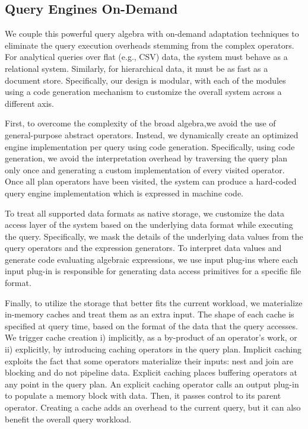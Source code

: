 \subsection{Query Engines On-Demand}

%
We couple this powerful query algebra with on-demand adaptation 
techniques to eliminate the query execution overheads stemming from
the complex operators. For analytical queries over flat (e.g., CSV) 
data, the system must behave as a relational system. 
Similarly, for hierarchical data, it must be as fast as a document store.
Specifically, our design is modular, with each of the modules using a 
code generation mechanism to customize the overall system across a 
different axis. 

%
First, to overcome the complexity of the broad algebra,we avoid the 
use of general-purpose abstract operators. Instead, we dynamically 
create an optimized engine implementation per query using code 
generation. Specifically, using code generation, we avoid the 
interpretation overhead by traversing the query plan only once and 
generating a custom implementation of every visited operator.  
Once all plan operators have been visited, the system can produce 
a hard-coded query engine implementation which is expressed in machine code.

%
To treat all supported data formats as native storage,  we 
customize the data access layer of the system based on the underlying 
data format while executing the query. Specifically, we mask the details of the underlying 
data values from the
query operators and the expression generators. To interpret data
values and generate code evaluating algebraic expressions, we use 
input plug-ins where each input plug-in is responsible for generating data 
access primitives for a specific file format. 


%
Finally, to utilize the storage that better fits the current workload, 
we materialize in-memory caches and treat them as an extra input. The 
shape of each cache is specified at query time, based on the format of
the data that the query accesses. 
We trigger cache creation i) implicitly, as a by-product of an 
operator's work, or ii) explicitly, by introducing caching operators 
in the query plan. Implicit caching exploits the fact that
some operators materialize their inputs: nest and join are
blocking and do not pipeline data. Explicit caching places buffering operators at any
point in the query plan. An explicit caching operator calls an output 
plug-in to populate a memory block with data. Then, it passes
control to its parent operator. Creating a cache adds an overhead to
the current query, but it can also benefit the overall query workload.

